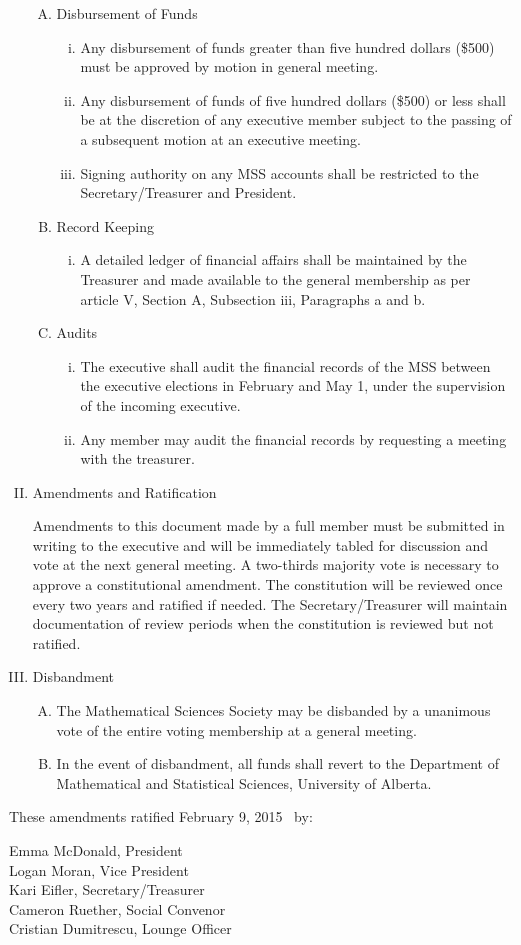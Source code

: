 \documentclass[11pt]{article}
\begin{document}
\begin{enumerate}[I.]
		\begin{enumerate}[A)]
			\item Disbursement of Funds
				\begin{enumerate}[i)]
					\item Any disbursement of funds greater than five hundred dollars (\$500) must be approved by motion in general meeting.
					\item  Any disbursement of funds of five hundred dollars (\$500) or less shall be at the discretion of any executive member subject to the passing of a subsequent motion at an executive meeting. 
					\item Signing authority on any MSS accounts shall be restricted to the Secretary/Treasurer and President. 
				\end{enumerate}
			\item Record Keeping
				\begin{enumerate}[i)]
					\item A detailed ledger of financial affairs shall be maintained by the Treasurer and made available to the general membership as per article V, Section A, Subsection iii, Paragraphs a and b. 
				\end{enumerate}
			\item Audits
				\begin{enumerate}[i)]
					\item The executive shall audit the financial records of the MSS between the executive elections in February and May 1, under the supervision of the incoming executive.
					\item Any member may audit the financial records by requesting a meeting with the treasurer. 
				\end{enumerate}
		\end{enumerate}
	\item Amendments and Ratification
	
		Amendments to this document made by a full member must be submitted in writing to the executive and will be immediately tabled for discussion and vote at the next general meeting. A two-thirds majority vote is necessary to approve a constitutional amendment. The constitution will be reviewed once every two years and ratified if needed. The Secretary/Treasurer will maintain documentation of review periods when the constitution is reviewed but not ratified. 
	\item Disbandment
		\begin{enumerate}[A)]
			\item The Mathematical Sciences Society may be disbanded by a unanimous vote of the entire voting membership at a general meeting. 
			\item  In the event of disbandment, all funds shall revert to the Department of Mathematical and Statistical Sciences, University of Alberta. 
		\end{enumerate}
\end{enumerate}

These amendments ratified February 9, 2015 \  by:

Emma McDonald, President\\
Logan Moran, Vice President\\
Kari Eifler, Secretary/Treasurer\\
Cameron Ruether, Social Convenor\\
Cristian Dumitrescu, Lounge Officer
\end{document}
